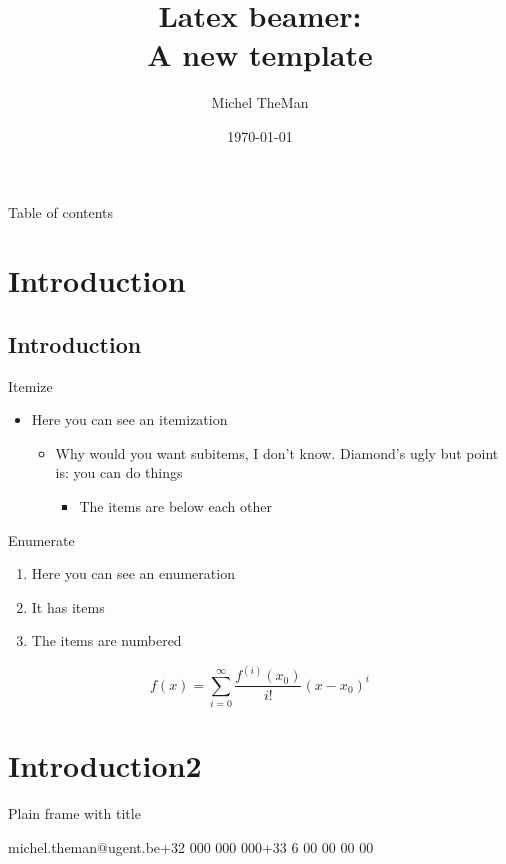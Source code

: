 \documentclass[ aspectratio=169]{beamer}
\title{Latex beamer:\\ A new template}
\date{\today}
\author{Michel TheMan}
\institute{\textbf{Department of Environment}\\Laboratory of Wood Technology, UGent-Woodlab }
\begin{document}
\frame{\titlepage} 
\begin{frame}{Table of contents}
	\tableofcontents
\end{frame}
 
\section{Introduction}
\subsection{Introduction}

\begin{frame}[fragile, t]{Itemize}    
\begin{itemize}
\item Here you can see an itemization
\begin{itemize}
\item Why would you want subitems, I don't know. Diamond's ugly but point is: you can do things
\begin{itemize}
\item The items are below each other
\end{itemize}
\end{itemize}
\end{itemize}
\end{frame}
 
\begin{frame}{Enumerate}
\begin{enumerate}
\item Here you can see an enumeration
\item It has items
\item The items are numbered    
\end{enumerate}
\[
	f(x)=\sum_{i=0}^\infty \frac{f^{(i)}(x_0)}{i!}(x-x_0)^i
\]
\end{frame}
 
\section{Introduction2}    
   

\begin{frame}[t]{Plain frame with title}
\lipsum[1]
\end{frame}

	{michel.theman@ugent.be}{+32 000 000 000}{+33 6 00 00 00 00}    
\end{document}
